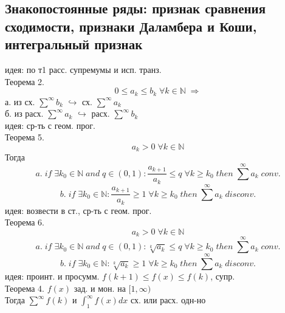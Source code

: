 \documentclass{article}
\begin{document}
\subsection{Знакопостоянные ряды: признак сравнения сходимости, признаки Даламбера и Коши, интегральный признак}
идея: по т1 расс. супремумы и исп. транз. \\
Теорема 2.
\begin{equation*}
    0 \leq a_k \leq b_k \; \forall k \in \mathbb N \; \Rightarrow
\end{equation*}
а. из сх. $\overset{\infty}{\sum} b_k$ $\hookrightarrow$ сх. $\overset{\infty}{\sum} a_k$ \\
б. из расх. $\overset{\infty}{\sum} a_k$ $\hookrightarrow$ расх. $\overset{\infty}{\sum} b_k$ \\
идея: ср-ть с геом. прог. \\
Теорема 5.
\begin{equation*}
    a_k>0 \; \forall k \in \mathbb N
\end{equation*}
Тогда
\begin{equation*}
    a. \; if \; \exists k_0 \in \mathbb N \; and \; q \in (0,1): \frac{a_{k+1}}{a_k} \leq q \; \forall k \geq k_0 \; then \; \overset{\infty}{\sum} a_k \; conv.
\end{equation*}
\begin{equation*}
    b. \; if \; \exists k_0 \in \mathbb N: \frac{a_{k+1}}{a_k} \geq 1 \; \forall k \geq k_0 \; then \; \overset{\infty}{\sum} a_k \; disconv.
\end{equation*}
идея: возвести в ст., ср-ть с геом. прог. \\
Теорема 6.
\begin{equation*}
    a_k>0 \; \forall k \in \mathbb N
\end{equation*}
\begin{equation*}
    a. \; if \; \exists k_0 \in \mathbb N \; and \; q \in (0,1): \sqrt[k]{a_k} \leq q \; \forall k \geq k_0 \; then \; \overset{\infty}{\sum} a_k \; conv.
\end{equation*}
\begin{equation*}
    b. \; if \; \exists k_0 \in \mathbb N: \sqrt[k]{a_k} \geq 1 \; \forall k \geq k_0 \; then \; \overset{\infty}{\sum} a_k \; disconv.
\end{equation*}
идея: проинт. и просумм. $f(k+1) \leq f(x) \leq f(k)$, супр. \\
Теорема 4. $f(x)$ зад. и мон. на $[1, \infty)$ \\
Тогда $\overset{\infty}{\sum} f(k)$ и $\int_1^\infty f(x)dx$ сх. или расх. одн-но \\
\end{document}
